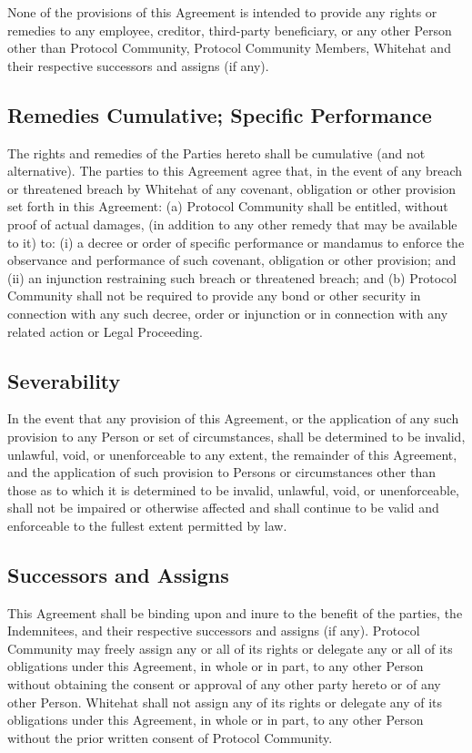 \documentclass{article}
\begin{document}
None of the provisions of this Agreement is intended to provide any rights or remedies to any employee, creditor, third-party beneficiary, or any other Person other than Protocol Community, Protocol Community Members, Whitehat and their respective successors and assigns (if any).

\subsection{Remedies Cumulative; Specific Performance}\label{subsec:remedies_cumulative}

The rights and remedies of the Parties hereto shall be cumulative (and not alternative). The parties to this Agreement agree that, in the event of any breach or threatened breach by Whitehat of any covenant, obligation or other provision set forth in this Agreement: (a) Protocol Community shall be entitled, without proof of actual damages, (in addition to any other remedy that may be available to it) to: (i) a decree or order of specific performance or mandamus to enforce the observance and performance of such covenant, obligation or other provision; and (ii) an injunction restraining such breach or threatened breach; and (b) Protocol Community shall not be required to provide any bond or other security in connection with any such decree, order or injunction or in connection with any related action or Legal Proceeding.

\subsection{Severability}\label{subsec:severability}

In the event that any provision of this Agreement, or the application of any such provision to any Person or set of circumstances, shall be determined to be invalid, unlawful, void, or unenforceable to any extent, the remainder of this Agreement, and the application of such provision to Persons or circumstances other than those as to which it is determined to be invalid, unlawful, void, or unenforceable, shall not be impaired or otherwise affected and shall continue to be valid and enforceable to the fullest extent permitted by law.

\subsection{Successors and Assigns}\label{subsec:successors_assigns}

This Agreement shall be binding upon and inure to the benefit of the parties, the Indemnitees, and their respective successors and assigns (if any). Protocol Community may freely assign any or all of its rights or delegate any or all of its obligations under this Agreement, in whole or in part, to any other Person without obtaining the consent or approval of any other party hereto or of any other Person. Whitehat shall not assign any of its rights or delegate any of its obligations under this Agreement, in whole or in part, to any other Person without the prior written consent of Protocol Community.
\end{document}
